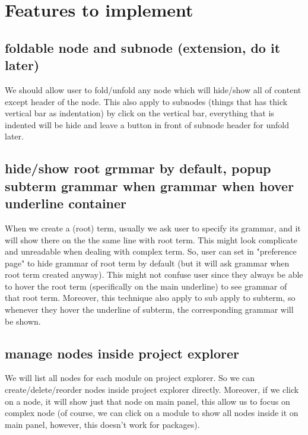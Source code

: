 

\chapter{Features to implement}

\section{foldable node and subnode (extension, do it later)}

We should allow user to fold/unfold any node which will hide/show all of content except header of the node. This also apply to subnodes (things that has thick vertical bar as indentation) by click on the vertical bar, everything that is indented will be hide and leave a button in front of subnode header for unfold later.

\section{hide/show root grmmar by default, popup subterm grammar when  grammar when hover underline container}

When we create a (root) term, usually we ask user to specify its grammar, and it will show there on the the same line with root term. This might look complicate and unreadable when dealing with complex term. So, user can set in "preference page" to hide grammar of root term by default (but it will ask grammar when root term created anyway). This might not confuse user since they always be able to hover the root term (specifically on the main underline) to see grammar of that root term. Moreover, this technique also apply to sub  apply to subterm, so whenever they hover the underline of subterm, the corresponding grammar will be shown.

\section{manage nodes inside project explorer}

We will list all nodes for each module on project explorer. So we can create/delete/reorder nodes inside project explorer directly. Moreover, if we click on a node, it will show just that node on main panel, this allow us to focus on complex node (of course, we can click on a module to show all nodes inside it on main panel, however, this doesn't work for packages).

